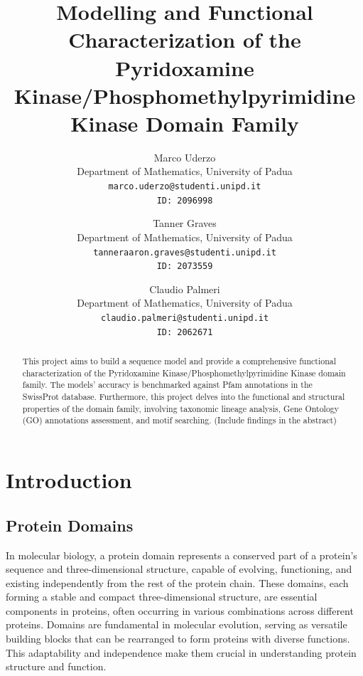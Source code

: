 \documentclass[10pt,twocolumn,letterpaper]{article}
\begin{document}

\title{Modelling and Functional Characterization of the Pyridoxamine Kinase/Phosphomethylpyrimidine Kinase Domain Family}

\author{
Marco Uderzo\\
{\small Department of Mathematics, University of Padua}\\
{\tt\small marco.uderzo@studenti.unipd.it}\\
{\tt\small ID: 2096998} \\
\and
Tanner Graves\\
{\small Department of Mathematics, University of Padua}\\
{\tt\small tanneraaron.graves@studenti.unipd.it}\\
{\tt\small ID: 2073559} \\
\and
Claudio Palmeri \\
{\small Department of Mathematics, University of Padua}\\
{\tt\small claudio.palmeri@studenti.unipd.it}\\
{\tt\small ID: 2062671} \\
}


\maketitle


\begin{abstract}
    This project aims to build a sequence model and provide a comprehensive functional characterization of the Pyridoxamine Kinase/Phosphomethylpyrimidine Kinase domain family. The models' accuracy is benchmarked against Pfam annotations in the SwissProt database. Furthermore, this project delves into the functional and structural properties of the domain family, involving taxonomic lineage analysis, Gene Ontology (GO) annotations assessment, and motif searching. (Include findings in the abstract)
\end{abstract}

\section{Introduction}

\subsection{Protein Domains}

In molecular biology, a protein domain represents a conserved part of a protein's sequence and three-dimensional structure, capable of evolving, functioning, and existing independently from the rest of the protein chain. These domains, each forming a stable and compact three-dimensional structure, are essential components in proteins, often occurring in various combinations across different proteins. Domains are fundamental in molecular evolution, serving as versatile building blocks that can be rearranged to form proteins with diverse functions. This adaptability and independence make them crucial in understanding protein structure and function.
\end{document}
